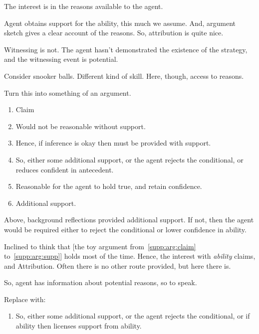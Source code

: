 \documentclass[10pt]{article}
\newcommand{\AR}[0]{\textsf{Attribution}}
\begin{document}
\begin{note}
  The interest is in the reasons available to the agent.

  Agent obtains support for the ability, this much we assume.
  And, argument sketch gives a clear account of the reasons.
  So, attribution is quite nice.

  Witnessing is not.
  The agent hasn't demonstrated the existence of the strategy, and the witnessing event is potential.

  Consider snooker balls.
  Different kind of skill.
  Here, though, access to reasons.
\end{note}

\begin{note}
  Turn this into something of an argument.
  \begin{enumerate}
  \item\label{supp:arg:claim} Claim
  \item\label{supp:arg:need-supp} Would not be reasonable without support.
  \item\label{supp:arg:supp} Hence, if inference is okay then must be provided with support.
  \item So, either some additional support, or the agent rejects the conditional, or reduces confident in antecedent.
  \item\label{supp:arg:reasonable} Reasonable for the agent to hold true, and retain confidence.
  \item Additional support.
  \end{enumerate}

  Above, background reflections provided additional support.
  If not, then the agent would be required either to reject the conditional or lower confidence in ability.

  Inclined to think that [the toy argument from~\ref{supp:arg:claim} to~\ref{supp:arg:supp}] holds most of the time.
  Hence, the interest with \emph{ability} claims, and \AR.
  Often there is no other route provided, but here there is.

  So, agent has information about potential reasons, so to speak.

  Replace with:
  \begin{enumerate}
  \item So, either some additional support, or the agent rejects the conditional, or if ability then licenses support from ability.
  \end{enumerate}


\end{note}
\end{document}
